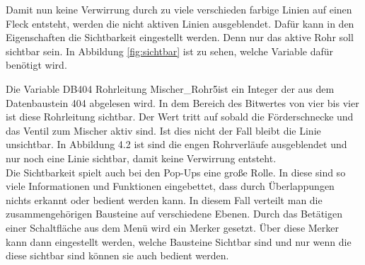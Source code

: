 Damit nun keine Verwirrung durch zu viele verschieden farbige Linien auf einen Fleck entsteht, werden die nicht aktiven Linien ausgeblendet. Dafür kann in den Eigenschaften die Sichtbarkeit eingestellt werden. Denn nur das aktive Rohr soll sichtbar sein. In Abbildung \ref{fig:sichtbar} ist zu sehen, welche Variable dafür benötigt wird. 
 
 \begin{figure}[H] %
 \end{figure} %

Die \glqq Variable DB404 Rohrleitung Mischer\_Rohr5\grqq ist ein Integer der aus dem Datenbaustein 404 abgelesen wird. In dem Bereich des Bitwertes von vier bis vier ist diese Rohrleitung sichtbar. Der Wert tritt auf sobald die Förderschnecke und das Ventil zum Mischer aktiv sind. Ist dies nicht der Fall bleibt die Linie unsichtbar. In Abbildung 4.2 ist sind die engen Rohrverläufe ausgeblendet und nur noch eine Linie sichtbar, damit keine Verwirrung entsteht. \\

Die Sichtbarkeit spielt auch bei den Pop-Ups eine große Rolle. In diese sind so viele Informationen und Funktionen eingebettet, dass durch Überlappungen nichts erkannt oder bedient werden kann. In diesem Fall verteilt man die zusammengehörigen Bausteine auf verschiedene Ebenen. Durch das Betätigen einer Schaltfläche aus dem Menü wird ein Merker gesetzt. Über diese Merker kann dann eingestellt werden, welche Bausteine Sichtbar sind und nur wenn die diese sichtbar sind können sie auch bedient werden. 


